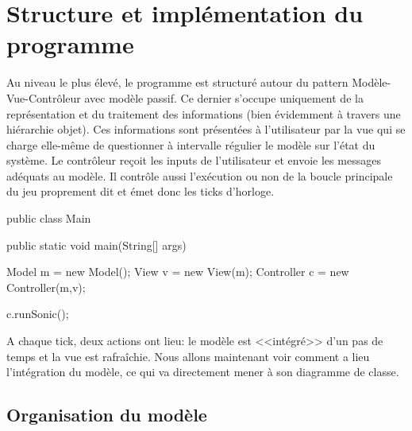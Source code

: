 \documentclass[a4paper, 12pt]{article}
\begin{document}
\section{Structure et implémentation du programme}

Au niveau le plus élevé, le programme est structuré autour du pattern Modèle-Vue-Contrôleur avec modèle passif. Ce dernier s'occupe uniquement de la représentation et du traitement des informations (bien évidemment à travers une hiérarchie objet). Ces informations sont présentées à l'utilisateur par la vue qui se charge elle-même de questionner à intervalle régulier le modèle sur l'état du système. Le contrôleur reçoit les inputs de l'utilisateur et envoie les messages adéquats au modèle. Il contrôle aussi l'exécution ou non de la boucle principale du jeu proprement dit et émet donc les ticks d'horloge.

\begin{minipage}[l]{0.6 \textwidth}
\begin{java}
public class Main {
  public static void main(String[] args){
    Model m = new Model();
    View v = new View(m);
    Controller c = new Controller(m,v);

    c.runSonic();
  }
}
\end{java}
\end{minipage}\begin{minipage}[r]{0.35 \textwidth}
\vspace{1em}
\end{minipage}

A chaque tick, deux actions ont lieu: le modèle est <<intégré>> d'un pas de temps et la vue est rafraîchie. Nous allons maintenant voir comment a lieu l'intégration du modèle, ce qui va directement mener à son diagramme de classe.

\subsection{Organisation du modèle}
\end{document}
